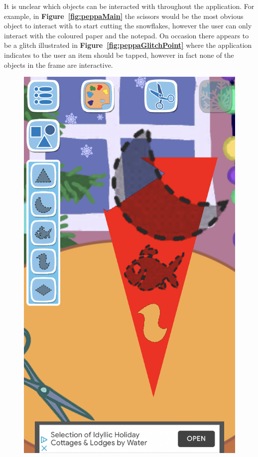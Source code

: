 \documentclass[11pt]{article}
\begin{document}
                    It is unclear which objects can be interacted with throughout the application. For example, in \textbf{Figure~\ref{fig:peppaMain}} the scissors would be the most obvious object to interact with to start cutting the snowflakes, however the user can only interact with the coloured paper and the notepad. On occasion there appears to be a glitch illustrated in \textbf{Figure~\ref{fig:peppaGlitchPoint}} where the application indicates to the user an item should be tapped, however in fact none of the objects in the frame are interactive. 
                    
                    \begin{figure}[!ht]
                        \begin{minipage}{0.32\textwidth}
                            \centering \includegraphics[width=0.8\linewidth]{Images/peppa/peppaShapes.PNG}

\end{minipage}
\end{figure}
\end{document}
